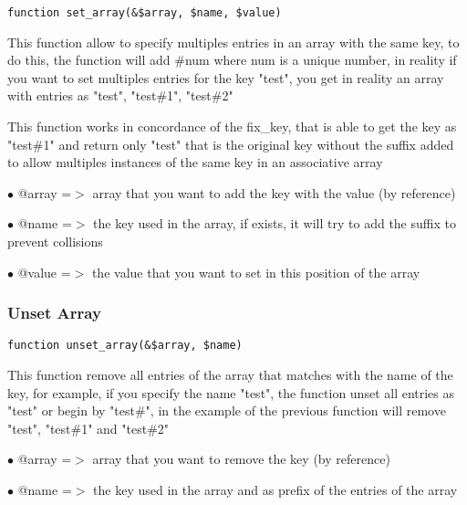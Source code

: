 \documentclass[a4paper]{article}
\begin{document}
\begin{lstlisting}
function set_array(&$array, $name, $value)
\end{lstlisting}

This function allow to specify multiples entries in an array with the same key,
to do this, the function will add \#num where num is a unique number, in reality
if you want to set multiples entries for the key "test", you get in reality an
array with entries as "test", "test\#1", "test\#2"

This function works in concordance of the fix\_key, that is able to get the key
as "test\#1" and return only "test" that is the original key without the suffix
added to allow multiples instances of the same key in an associative array

\begin{compactitem}
\item[\color{myblue}$\bullet$] @array =$>$ array that you want to add the key with the value (by reference)
\item[\color{myblue}$\bullet$] @name  =$>$ the key used in the array, if exists, it will try to add the suffix to
          prevent collisions
\item[\color{myblue}$\bullet$] @value =$>$ the value that you want to set in this position of the array
\end{compactitem}

\hypertarget{toc276}{}
\subsubsection{Unset Array}

\begin{lstlisting}
function unset_array(&$array, $name)
\end{lstlisting}

This function remove all entries of the array that matches with the name of
the key, for example, if you specify the name "test", the function unset all
entries as "test" or begin by "test\#", in the example of the previous function
will remove "test", "test\#1" and "test\#2"

\begin{compactitem}
\item[\color{myblue}$\bullet$] @array =$>$ array that you want to remove the key (by reference)
\item[\color{myblue}$\bullet$] @name  =$>$ the key used in the array and as prefix of the entries of the array
\end{compactitem}
\end{document}
